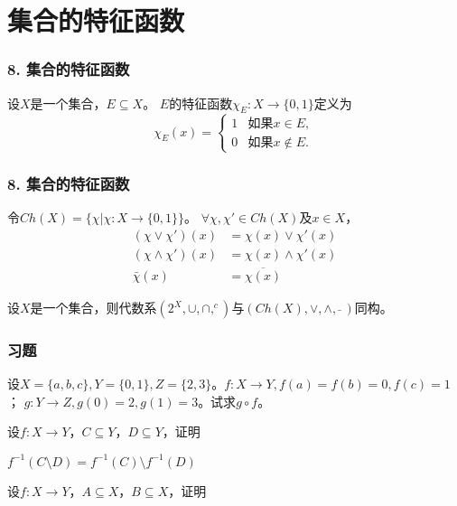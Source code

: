 \documentclass{beamer}
\begin{document}
\begin{CJK*}{UTF8}{gbsn}
\begin{frame}
\end{frame}

\section{集合的特征函数}
\begin{frame}
  \frametitle{8. 集合的特征函数}
  \begin{Def}
    设$X$是一个集合，$E \subseteq X$。 $E$的\alert{特征函数}$\chi_E:X\to \{0,1\}$定义为
    \begin{equation*}
      \chi_E(x)=
      \begin{cases}
        1 & \text{如果} x \in E,\\
        0 & \text{如果} x \notin E.
      \end{cases}
    \end{equation*}
  \end{Def}
\end{frame}
\begin{frame}
  \frametitle{8. 集合的特征函数}
  \begin{Def}
    令$Ch(X) = \{\chi |\chi:X \to \{0,1\}\}$。
    $\forall \chi, \chi' \in Ch(X)$及$x \in X$，
    \begin{align}
      (\chi \lor \chi')(x) &= \chi(x) \lor \chi'(x)\nonumber\\
      (\chi \land \chi')(x) &= \chi(x) \land \chi'(x)\nonumber\\
      \bar{\chi}(x) &=   \overline{\chi(x)}
    \end{align}
  \end{Def}
  \begin{Thm}
    设$X$是一个集合，则代数系$(2^X, \cup, \cap, ^c)$与$(Ch(X), \lor, \land, \bar{} \ )$同构。
  \end{Thm}
\end{frame}

\begin{frame}
  \frametitle{习题}
    \begin{Exercise}
  设$X=\{a,b,c\}, Y=\{0,1\}, Z=\{2,3\}$。$f:X \to Y, f(a) = f(b) = 0, f(c) = 1$；
  $g:Y\to Z, g(0) = 2, g(1) = 3$。试求$g\circ f$。
  \end{Exercise}
  \begin{Exercise}
    设$f:X \to Y$，$C \subseteq Y$，$D \subseteq Y$，证明

    $f^{-1}(C \setminus D) = f^{-1}(C) \setminus f^{-1}(D)$
  \end{Exercise}
    \begin{Exercise}
    设$f:X \to Y$，$A \subseteq X$，$B \subseteq X$，证明


\end{Exercise}
\end{frame}
\end{CJK*}
\end{document}
